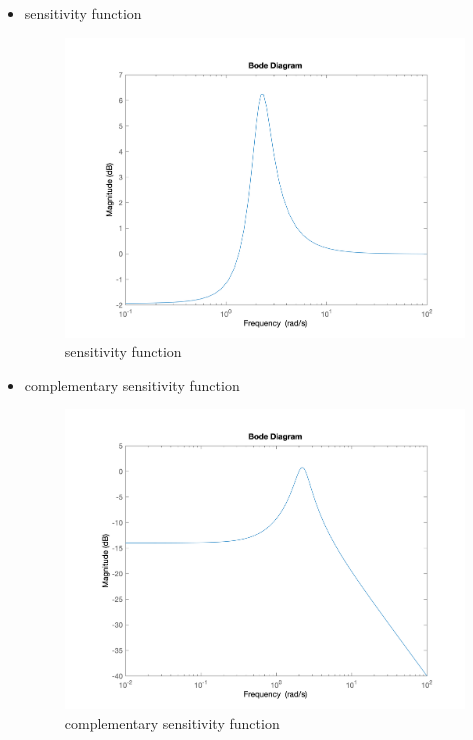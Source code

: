 \begin{itemize}
\begin{figure}[H]
	\end{figure}
	\item sensitivity function
	\begin{figure}[H]
		\caption{sensitivity function}
		\centering
		\includegraphics[width=12cm]{../Figure/Q1/Q1_a/s_bode.png}
	\end{figure}
	\item complementary sensitivity function
	\begin{figure}[H]
		\caption{complementary sensitivity function}
		\centering
		\includegraphics[width=12cm]{../Figure/Q1/Q1_a/t_bode.png}
	\end{figure}
\end{itemize}